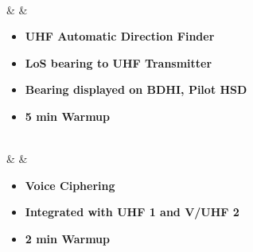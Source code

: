 \documentclass[fontInter]{TechCheck}
\begin{document}
\begin{listlongtable}
\begin{minipage}[t]{\linewidth}
\begin{itemize}
			\end{itemize}
		\end{minipage} \\
		\midrule
		\textbf{\textbullet} &   &
		\begin{minipage}[t]{\linewidth}
			\vspace{-7pt}
			\begin{itemize}
				\item \textbf{UHF Automatic Direction Finder}
				\item \textbf{LoS bearing to UHF Transmitter}
				\item \textbf{Bearing displayed on BDHI, Pilot HSD}
				\item \textbf{5 min Warmup}
			\end{itemize}
		\end{minipage} \\
		\midrule
		\textbf{\textbullet} &   &
		\begin{minipage}[t]{\linewidth}
			\vspace{-7pt}
			\begin{itemize}
				\item \textbf{Voice Ciphering}
				\item \textbf{Integrated with UHF 1 and V/UHF 2}
				\item \textbf{2 min Warmup}
			\end{itemize}
		\end{minipage} \\
	\end{listlongtable}
\end{document}
